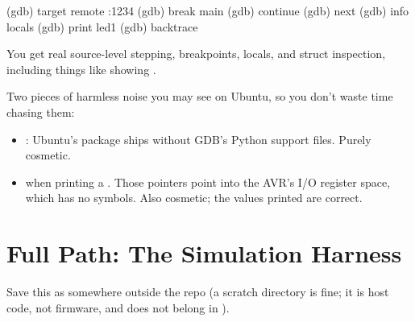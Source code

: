 \begin{console}
(gdb) target remote :1234
(gdb) break main
(gdb) continue
(gdb) next
(gdb) info locals
(gdb) print led1
(gdb) backtrace
\end{console}

\noindent You get real source-level stepping, breakpoints, locals, and struct inspection,
including things like  showing
.

Two pieces of harmless noise you may see on Ubuntu, so you don't waste time chasing them:
\begin{itemize}
  \item {}: Ubuntu's
     package ships without GDB's Python support files. Purely cosmetic.
  \item {} when printing a
    . Those pointers point into the AVR's I/O register space, which has no symbols.
    Also cosmetic; the values printed are correct.
\end{itemize}

\section{Full Path: The Simulation Harness}
\label{sim:sec:harness}
Save this as  somewhere outside the repo (a scratch directory is fine; it
is host code, not firmware, and does not belong in ).

